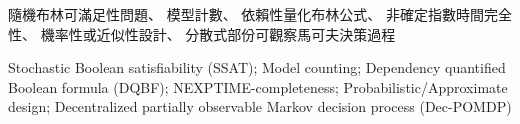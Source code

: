 




\newcommand{\myenglishkeywords}{
  Stochastic Boolean satisfiability (SSAT);
  Model counting;
  Dependency quantified Boolean formula (DQBF);
  NEXPTIME-completeness;
  Probabilistic/Approximate design;
  Decentralized partially observable Markov decision process (Dec-POMDP)
}

\newcommand{\mychinesekeywords}{
  隨機布林可滿足性問題、
  模型計數、
  依賴性量化布林公式、
  非確定指數時間完全性、
  機率性或近似性設計、
  分散式部份可觀察馬可夫決策過程
}

\afterpage{\blankpage}
\renewcommand{\baselinestretch}{1.0}

\renewcommand{\baselinestretch}{2.0}

\afterpage{\blankpage}


\frontmatter
\begin{acknowledgements}
  
\end{acknowledgements}
\begin{abstractzh}{\mychinesekeywords}
  
\end{abstractzh}
\begin{abstracten}{\myenglishkeywords}
  
\end{abstracten}


\afterpage{\blankpage}
\tableofcontents
\afterpage{\blankpage}
\listoffigures
\listoftables
\cleardoublepage
{}
{}
\listofalgorithms

\afterpage{\blankpage}
\mainmatter


\afterpage{\blankpage}


\afterpage{\blankpage}



\afterpage{\blankpage}




\afterpage{\blankpage}


